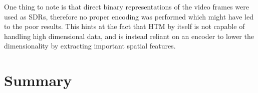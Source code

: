 One thing to note is that direct binary representations of the video frames were used as SDRs, therefore no proper encoding was performed which might have led to the poor results. This hints at the fact that HTM by itself is not capable of handling high dimensional data, and is instead reliant on an encoder to lower the dimensionality by extracting important spatial features.


\section{Summary}